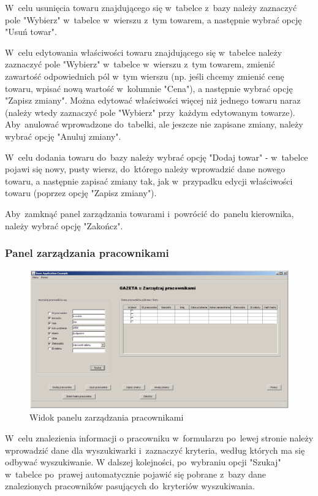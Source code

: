 W~celu usunięcia towaru znajdującego się w~tabelce z~bazy należy zaznaczyć pole "Wybierz" w~tabelce w~wierszu z~tym towarem, a następnie wybrać opcję "Usuń towar".

W~celu edytowania właściwości towaru znajdującego się w~tabelce należy zaznaczyć pole "Wybierz" w~tabelce w~wierszu z~tym towarem, zmienić zawartość odpowiednich pól w~tym wierszu (np. jeśli chcemy zmienić cenę towaru, wpisać nową wartość w~kolumnie "Cena"), a następnie wybrać opcję "Zapisz zmiany". Można edytować właściwości więcej niż jednego towaru naraz (należy wtedy zaznaczyć pole "Wybierz" przy~każdym edytowanym towarze). Aby~anulować wprowadzone do~tabelki, ale jeszcze nie zapisane zmiany, należy wybrać opcję "Anuluj zmiany".

W~celu dodania towaru do~bazy należy wybrać opcję "Dodaj towar" - w~tabelce pojawi się nowy, pusty wiersz, do~którego należy wprowadzić dane nowego towaru, a następnie zapisać zmiany tak, jak w~przypadku edycji właściwości towaru (poprzez opcję "Zapisz zmiany").

Aby~zamknąć panel zarządzania towarami i~powrócić do~panelu kierownika, należy wybrać opcję "Zakończ".
\clearpage
\subsubsection{Panel zarządzania pracownikami}
\begin{figure}[h]
\begin{center}
\includegraphics[width=20cm,angle=90,keepaspectratio]{gfx/zarzadzaj_pracownikami.png}
\end{center}
\caption{Widok panelu zarządzania pracownikami}
\end{figure}
W~celu znalezienia informacji o pracowniku w~formularzu po~lewej stronie należy wprowadzić dane dla wyszukiwarki i~zaznaczyć kryteria, według których ma się odbywać wyszukiwanie. W dalszej kolejności, po~wybraniu opcji "Szukaj" w~tabelce po~prawej automatycznie pojawić się pobrane z~bazy dane znalezionych pracowników pasujących do~kryteriów wyszukiwania.


